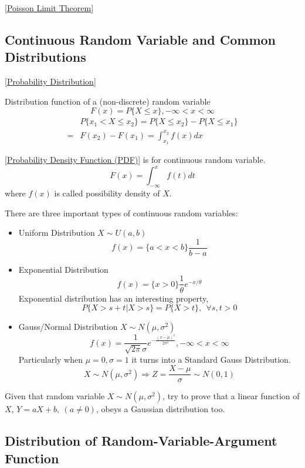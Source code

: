 [\href{https://en.wikipedia.org/wiki/Poisson_limit_theorem}{Poisson Limit Theorem}]

\subsection{Continuous Random Variable and Common Distributions}

[\href{https://en.wikipedia.org/wiki/Probability_distribution}{Probability Distribution}]

Distribution function of a (non-discrete) random variable
$$ F(x) = P\{X\leq x\}, -\infty < x < \infty$$
\begin{align}
	 & P\{x_1<X\leq x_2\} = P\{X\leq x_2\} - P\{X\leq x_1\}\\
	=& F(x_2)-F(x_1) = \int_{x_1}^{x_2} f(x) dx
\end{align}

[\href{https://en.wikipedia.org/wiki/Probability_density_function}{Probability
Density Function (PDF)}] is for continuous random variable.
$$ F(x) = \int_{-\infty}^x f(t)dt $$
where $f(x)$ is called possibility density of $X$.

There are three important types of continuous random variables:
\begin{itemize}
\item Uniform Distribution $X\sim U(a,b)$\newline
 $$ f(x) = \{a<x<b\} \frac{1}{b-a} $$
\item Exponential Distribution\newline
 $$ f(x) = \{x>0\} \frac{1}{\theta} e^{-x/\theta} $$
Exponential distribution has an interesting property,
$$P\{X>s+t|X>s\} = P\{X>t\}, ~~\forall s, t > 0$$
\item Gauss/Normal Distribution $X\sim N(\mu,\sigma^2)$\newline
 $$ f(x) = \frac{1}{\sqrt{2\pi}\sigma} e^{-\frac{(x-\mu)^2}{2\sigma^2}}
		 , -\infty<x<\infty $$
 Particularly when $\mu = 0, \sigma = 1$ it turns into a Standard Gauss Distribution.
 $$ X\sim N(\mu,\sigma^2) \Rightarrow Z = \frac{X-\mu}{\sigma}\sim N(0,1) $$
\end{itemize}

Given that random variable $X\sim N(\mu, \sigma^2)$, try to prove that a
linear function of $X$, $Y=aX+b, ~(a\neq 0)$, obeys a Gaussian distribution too.

\subsection{Distribution of Random-Variable-Argument Function}

